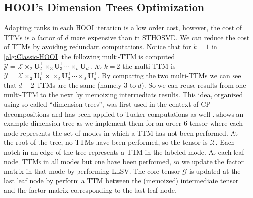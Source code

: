 

\subsection{HOOI's Dimension Trees Optimization}
    Adapting ranks in each HOOI iteration is a low order cost, however, the cost
    of TTMs is a factor of $d$ more expensive than in STHOSVD. We can reduce the
    cost of TTMs by avoiding redundant computations. Notice that for $k = 1$ in
    \cref{alg:Classic-HOOI} the following multi-TTM is computed $\mathcal{Y} =
    \mathcal{X} \times_2 \mathbf{U}_{2}^\intercal \times_3
    \mathbf{U}_{3}^\intercal \cdots \times_d \mathbf{U}_{d}^\intercal$. At $k = 2$ the
    multi-TTM is $\mathcal{Y} = \mathcal{X} \times_2 \mathbf{U}_{1}^\intercal \times
    \times_3 \mathbf{U}_{3}^\intercal \cdots \times_d \mathbf{U}_{d}^\intercal$. By
    comparing the two multi-TTMs we can see that $d - 2$ TTMs are the same
    (namely 3 to $d$). So we can reuse results from one multi-TTM to the next by
    memoizing intermediate results. This idea, organized using so-called
    ``dimension trees'', was first used in the context of CP decompositions
    \cite{PTC13a} and has been applied to Tucker computations as well
    \cite{kaya2019computing,MLB24}.  shows an example
    dimension tree as we implement them for an order-$6$ tensor where each node
    represents the set of modes in which a TTM has not been performed. At the
    root of the tree, no TTMs have been performed, so the tensor is $\mathcal{X}$.
    Each notch in an edge of the tree represents a TTM in the labeled mode. At
    each leaf node, TTMs in all modes but one have been performed, so we update
    the factor matrix in that mode by performing LLSV. The core tensor $\mathcal{G}$
    is updated at the last leaf node by perform a TTM between the (memoized)
    intermediate tensor and the factor matrix corresponding to the last leaf
    node.

